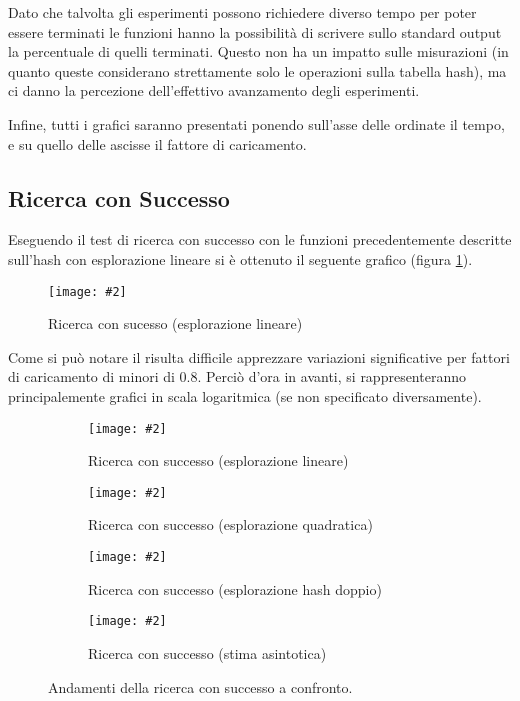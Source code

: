 \documentclass{article}
\newcommand{\image}[3][1]{
	\centering
	\texttt{[image: \#2]}
	\caption{#3}
}
\begin{document}
Dato che talvolta gli esperimenti possono richiedere diverso tempo per poter essere terminati le funzioni hanno la possibilità di scrivere sullo standard output la percentuale di quelli terminati. Questo non ha un impatto sulle misurazioni (in quanto queste considerano strettamente solo le operazioni sulla tabella hash), ma ci danno la percezione dell'effettivo avanzamento degli esperimenti.

Infine, tutti i grafici saranno presentati ponendo sull'asse delle ordinate il tempo, e su quello delle ascisse il fattore di caricamento.

\subsection{Ricerca con Successo}

Eseguendo il test di ricerca con successo con le funzioni precedentemente descritte sull'hash con esplorazione lineare si è ottenuto il seguente grafico (figura \ref{fig:Successo_Lineare_scala_lineare}).
\begin{figure}[H]
\image[0.75]{Successo_Lineare_scala_lineare}{Ricerca con sucesso (esplorazione lineare)}
\label{fig:Successo_Lineare_scala_lineare}
\end{figure}

\label{Motivazione_scala}
Come si può notare il risulta difficile apprezzare variazioni significative per fattori di caricamento di minori di 0.8. Perciò d'ora in avanti, si rappresenteranno principalemente grafici in scala logaritmica (se non specificato diversamente). 

\begin{figure}[H]
\begin{subfigure}[b]{0.5\textwidth}
\image{Successo_Lineare_scala_logaritmica}{Ricerca con successo (esplorazione lineare)}
\end{subfigure}
\begin{subfigure}[b]{0.5\textwidth}
\image{Successo_Quadratico_scala_logaritmica}{Ricerca con successo (esplorazione quadratica)}
\end{subfigure}
\begin{subfigure}[b]{0.5\textwidth}
\image{Successo_Doppio_scala_logaritmica}{Ricerca con successo (esplorazione hash doppio)}
\end{subfigure}
\begin{subfigure}[b]{0.5\textwidth}
\image{Successo_Asintotica_scala_logaritmica}{Ricerca con successo (stima asintotica)}
\end{subfigure}
\caption{Andamenti della ricerca con successo a confronto.}
\label{fig:Successo_quartetto}
\end{figure}
\end{document}

